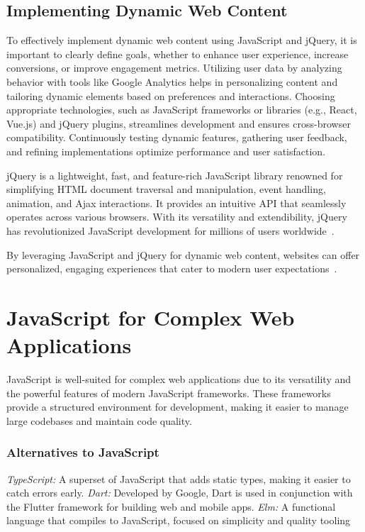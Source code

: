 \subsection{Implementing Dynamic Web Content}

To effectively implement dynamic web content using JavaScript and jQuery, it is important to clearly define goals, whether to enhance user experience, increase conversions, or improve engagement metrics. Utilizing user data by analyzing behavior with tools like Google Analytics helps in personalizing content and tailoring dynamic elements based on preferences and interactions. Choosing appropriate technologies, such as JavaScript frameworks or libraries (e.g., React, Vue.js) and jQuery plugins, streamlines development and ensures cross-browser compatibility. Continuously testing dynamic features, gathering user feedback, and refining implementations optimize performance and user satisfaction.

jQuery is a lightweight, fast, and feature-rich JavaScript library renowned for simplifying HTML document traversal and manipulation, event handling, animation, and Ajax interactions. It provides an intuitive API that seamlessly operates across various browsers. With its versatility and extendibility, jQuery has revolutionized JavaScript development for millions of users worldwide~\cite{jquery_history}.

By leveraging JavaScript and jQuery for dynamic web content, websites can offer personalized, engaging experiences that cater to modern user expectations~\cite{moldstud2024}.

\section{JavaScript for Complex Web Applications}

JavaScript is well-suited for complex web applications due to its versatility and the powerful features of modern JavaScript frameworks. These frameworks provide a structured environment for development, making it easier to manage large codebases and maintain code quality.

\subsubsection{Alternatives to JavaScript}

\textit{TypeScript:} A superset of JavaScript that adds static types, making it easier to catch errors early.
\newline\textit{Dart:} Developed by Google, Dart is used in conjunction with the Flutter framework for building web and mobile apps.
\newline\textit{Elm:} A functional language that compiles to JavaScript, focused on simplicity and quality tooling~\cite{mdn-js-guide}


